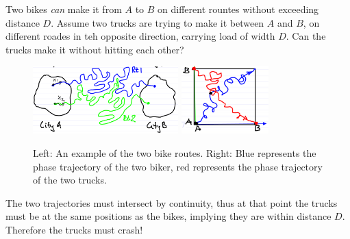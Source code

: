\begin{ex}
	Two bikes \emph{can} make it from $A$ to $B$ on different rountes without exceeding distance $D$. Assume two trucks are trying to make it between $A$ and $B$, on different roades in teh opposite direction, carrying load of width $D$. Can the trucks make it without hitting each other?	
	\begin{figure}[h]
		\centering
		\includegraphics[width=0.5\textwidth]{figures/intro/7routes.png}
		\hspace{0.05\textwidth}
		\includegraphics[width=0.3\textwidth]{figures/intro/8truck_geometry.png}
		\caption{Left: An example of the two bike routes. Right: Blue represents the phase trajectory of the two biker, red represents the phase trajectory of the two trucks.}
	\end{figure}

The two trajectories must intersect by continuity, thus at that point the trucks must be at the same positions as the bikes, implying they are within distance $D$. Therefore the trucks must crash!	
\end{ex}


